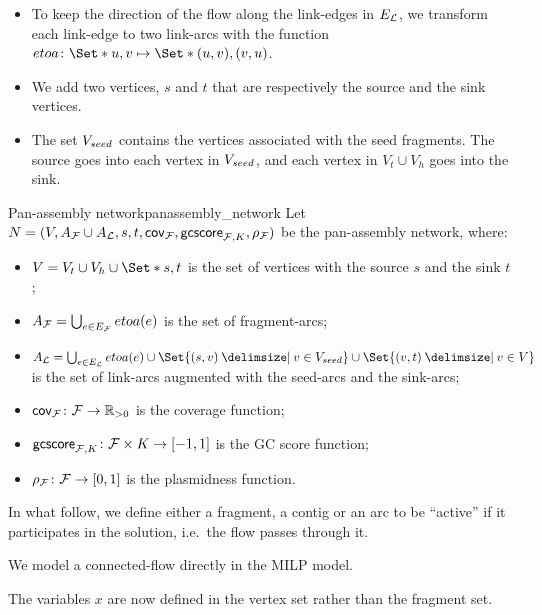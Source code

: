 \begin{itemize}
  \item To keep the direction of the flow along the link-edges in \(E_{\mathcal{L}}{}\), we transform each link-edge to two link-arcs with the function \(etoa \colon \Set*{u, v} \mapsto \Set*{(u, v), (v, u)}\).
  \item We add two vertices, \(s\) and \(t\) that are respectively the source and the sink vertices.
  \item The set \(V_{seed}{}\) contains the vertices associated with the seed fragments.
    The source goes into each vertex in \(V_{seed}{}\), and each vertex in \(V_t \cup V_h\) goes into the sink.
\end{itemize}

\begin{definition}{Pan-assembly network}{panassembly_network}
  Let \(N = (V, A_{\mathcal{F}}{} \cup A_{\mathcal{L}}{}, s, t, \mathsf{cov}_{\mathcal{F}{}}, \mathsf{gcscore}_{\mathcal{F}{}, K}, \rho_{\mathcal{F}{}})\) be the pan-assembly network, where:

  \begin{itemize}
    \item \(V = V_t \cup V_h \cup \Set*{s, t}\) is the set of vertices with the source \(s\) and the sink \(t\);
    \item \(A_{\mathcal{F}}{} = \bigcup_{e \in E_{\mathcal{F}}{}} etoa(e)\) is the set of fragment-arcs;
    \item \(A_\Links{} = \bigcup_{e \in E_\Links{}} etoa(e) \cup \Set{(s, v) \given v \in \VSeed{}} \cup \Set{(v, t) \given v \in V}\) is the set of link-arcs augmented with the seed-arcs and the sink-arcs;
    \item \(\mathsf{cov}_{\mathcal{F}{}} \colon \mathcal{F}{} \to \mathbb{R}{}_{> 0}\) is the coverage function;
    \item \(\mathsf{gcscore}_{\mathcal{F}{}, K} \colon \mathcal{F}{} \times K \to [-1, 1]\) is the GC score function;
    \item \(\rho_{\mathcal{F}{}} \colon \mathcal{F}{} \to [0, 1]\) is the plasmidness function.
  \end{itemize}
\end{definition}

In what follow, we define either a fragment, a contig or an arc to be \enquote{active} if it participates in the solution, i.e.\ the flow passes through it.

\begin{newfeatbox}
  We model a connected-flow directly in the MILP model.

  \begin{notebox}
    The variables \(x\) are now defined in the vertex set rather than the fragment set.
  \end{notebox}
\end{newfeatbox}

